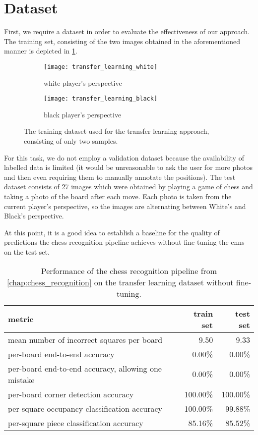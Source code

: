 \documentclass[../main.tex]{subfiles}
\begin{document}
\section{Dataset}
First, we require a dataset in order to evaluate the effectiveness of our approach.
The training set, consisting of the two images obtained in the aforementioned manner is depicted in \cref{fig:transfer_learning_train_data}.
\begin{figure}
    \centering
    \begin{subfigure}[b]{0.47\textwidth}
        \centering
        \texttt{[image: transfer\_learning\_white]}
        \caption{white player's perspective}
    \end{subfigure}
    \hfill
    \begin{subfigure}[b]{0.47\textwidth}
        \centering
        \texttt{[image: transfer\_learning\_black]}
        \caption{black player's perspective}
    \end{subfigure}
    \caption{The training dataset used for the transfer learning approach, consisting of only two samples.}
    \label{fig:transfer_learning_train_data}
\end{figure}
For this task, we do not employ a validation dataset because the availability of labelled data is limited (it would be unreasonable to ask the user for more photos and then even requiring them to manually annotate the positions).
The test dataset consists of 27 images which were obtained by playing a game of chess and taking a photo of the board after each move.
Each photo is taken from the current player's perspective, so the images are alternating between White's and Black's perspective.

At this point, it is a good idea to establish a baseline for the quality of predictions the chess recognition pipeline achieves without fine-tuning the \glspl{cnn} on the test set.
\begin{table}
    \centering
    \begin{tabular}{lrr}
        \toprule
        metric & train set & test set \\
        \midrule
        mean number of incorrect squares per board          & 9.50     & 9.33 \\
        per-board end-to-end accuracy                       & 0.00\%   & 0.00\%   \\
        per-board end-to-end accuracy, allowing one mistake & 0.00\%   & 0.00\%   \\
        per-board corner detection accuracy                 & 100.00\% & 100.00\% \\
        per-square occupancy classification accuracy        & 100.00\% & 99.88\% \\
        per-square piece classification accuracy            & 85.16\%  & 85.52\% \\
        \bottomrule
    \end{tabular}
    \caption{Performance of the chess recognition pipeline from \cref{chap:chess_recognition} on the transfer learning dataset without fine-tuning.}
\end{table}
\end{document}

